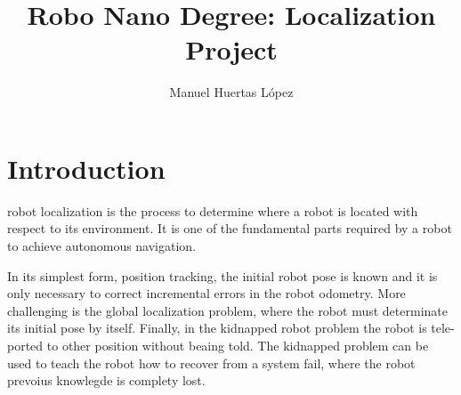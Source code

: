 \documentclass[10pt,journal,compsoc]{IEEEtran}
\begin{document}
\title{Robo Nano Degree: Localization Project }

\author{Manuel Huertas L\'opez}

%
{}


\maketitle
\IEEEdisplaynontitleabstractindextext
\IEEEpeerreviewmaketitle
\section{Introduction}
\label{sec:introduction}

 robot localization is the process to determine where a robot is located with respect to its environment. It is one of the fundamental parts required by a robot to achieve autonomous navigation.

In its simplest form, position tracking, the initial robot pose is known and it is only necessary to correct incremental errors in the robot odometry. More challenging is the global localization problem, where the robot must determinate its initial pose by itself. Finally, in the kidnapped robot problem the robot is tele-ported to other position without beaing told. The kidnapped problem can be used to teach the robot how to recover from a system fail, where the robot prevoius knowlegde is complety lost.
\end{document}
